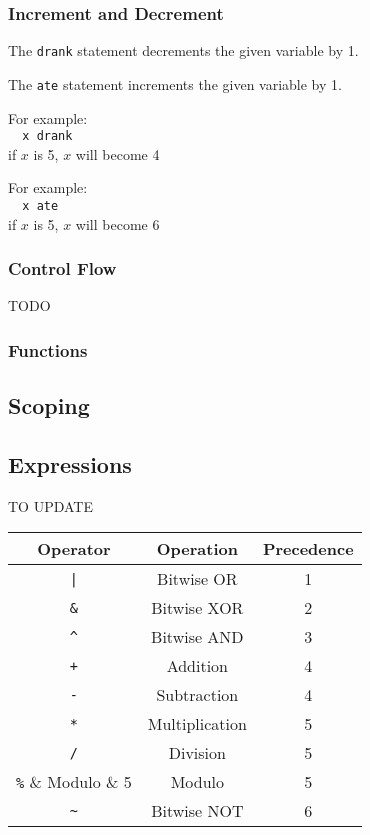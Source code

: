 \documentclass[a4paper,11pt]{article}
\begin{document}
\subsubsection{Increment and Decrement}
The \verb:drank: statement decrements the given variable by 1.

The \verb:ate: statement increments the given variable by 1.

For example:\\
\verb:  x drank:\\
if $x$ is 5, $x$ will become 4

For example:\\
\verb:  x ate:\\
if $x$ is 5, $x$ will become 6

\subsubsection{Control Flow}
TODO

\subsubsection{Functions}

\subsection{Scoping}

\subsection{Expressions}
TO UPDATE
\begin{tabular}{ccc}
Operator & Operation   & Precedence \\
\hline
\hline
\verb:|: & Bitwise OR  & 1 \\
\hline
\verb:&: & Bitwise XOR & 2 \\
\hline
\verb:^: & Bitwise AND & 3 \\
\hline
\verb:+: & Addition    & 4 \\
\verb:-: & Subtraction & 4 \\
\hline
\verb:*: & Multiplication & 5 \\
\verb:/: & Division       & 5 \\
\verb:%: & Modulo         & 5 \\
\hline
\verb:~: & Bitwise NOT    & 6 \\
\end{tabular}
\end{document}
